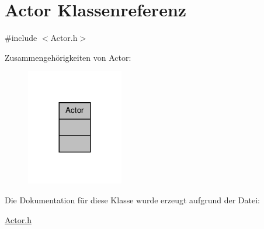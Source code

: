 \hypertarget{class_actor}{\section{Actor Klassenreferenz}
\label{class_actor}
}


{\ttfamily \#include $<$Actor.\-h$>$}



Zusammengehörigkeiten von Actor\-:
\nopagebreak
\begin{figure}[H]
\begin{center}
\leavevmode
\includegraphics[width=120pt]{class_actor__coll__graph}
\end{center}
\end{figure}


Die Dokumentation für diese Klasse wurde erzeugt aufgrund der Datei\-:\begin{DoxyCompactItemize}
\item 
\hyperlink{_actor_8h}{Actor.\-h}\end{DoxyCompactItemize}
